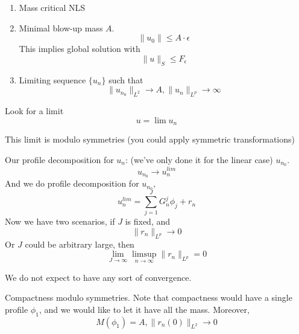 \begin{enumerate}
    \item Mass critical NLS
    \item Minimal blow-up mass $A$.
    \begin{equation*}
        \|u_0\|\leq A\cdot\epsilon
    \end{equation*}
    This implies global solution with 
    \begin{equation*}
        \|u\|_S\leq F_\epsilon
    \end{equation*}
    \item Limiting sequence $\{u_n\}$ such that
    \begin{equation*}
        \|u_{n_0}\|_{L^2}\to A, \|u_n\|_{L^p}\to\infty
    \end{equation*}
\end{enumerate}
Look for a limit 
\begin{equation*}
    u=\lim u_n
\end{equation*}
\begin{note}
    This limit is modulo symmetries  (you could apply symmetric transformations)
\end{note}

Our profile decomposition for $u_n$: (we've only done it for the linear case) $u_{n_0}$. 
\begin{equation*}
    u_{n_0}\to u_n^{lim}
\end{equation*}
And we do profile decomposition for $u_{n_0}$, 
\begin{equation*}
    u_n^{lim}=\sum_{j=1}^J G_n^j\phi_j+r_n
\end{equation*}
Now we have two scenarios, if $J$ is fixed, and 
\begin{equation*}
    \|r_n\|_{L^p}\to 0
\end{equation*}
Or $J$ could be arbitrary large, then
\begin{equation*}
    \lim_{J\to\infty}\limsup_{n\to\infty}\|r_n\|_{L^p}=0
\end{equation*}
\begin{note}
    We do not expect to have any sort of convergence.
\end{note}

Compactness modulo symmetries. 
Note that compactness would have a single profile $\phi_1$, and we would like to let it have all the mass. Moreover,
\begin{equation*}
    M(\phi_1)=A, \|r_n(0)\|_{L^2}\to 0
\end{equation*}

